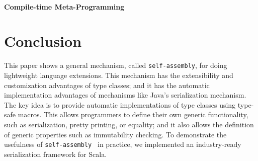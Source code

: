 \documentclass[preprint,nocopyrightspace]{sigplanconf}
\newcommand{\selfassembly}{\texttt{self-assembly~}}
\newcommand{\sselfassembly}{\texttt{self-assembly}}
\begin{document}
\paragraph{Compile-time Meta-Programming}



\cite{TemplateYourBoilerplate}
\cite{Pickling}
\cite{SYB}

\section{Conclusion}

This paper shows a general mechanism, called \sselfassembly, for doing
lightweight language extensions. This mechanism has the extensibility
and customization advantages of type classes; and it has the automatic
implementation advantages of mechanisms like Java's serialization
mechanism.  The key idea is to provide
automatic implementations of type classes using type-safe macros.
This allows programmers to define their own generic
functionality, such as serialization, pretty printing, or equality;
and it also allows the definition of generic properties such as
immutability checking. To demonstrate the usefulness of \selfassembly
in practice, we implemented an industry-ready
serialization framework for Scala.









% 




\end{document}
